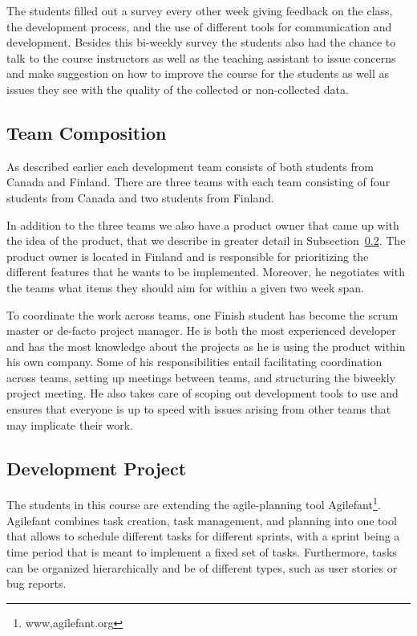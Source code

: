 The students filled out a survey every other week giving feedback on the class, the development process, and the use of different tools for communication and development.
Besides this bi-weekly survey the students also had the chance to talk to the course instructors as well as the teaching assistant to issue concerns and make suggestion on how to improve the course for the students as well as issues they see with the quality of the collected or non-collected data.

\subsection{Team Composition}
As described earlier each development team consists of both students from Canada and Finland.
There are three teams with each team consisting of four students from Canada and two students from Finland.

In addition to the three teams we also have a product owner that came up with the idea of the product, that we describe in greater detail in Subsection~\ref{chap:make:subset:devproject}.
The product owner is located in Finland and is responsible for prioritizing the different features that he wants to be implemented.
Moreover, he negotiates with the teams what items they should aim for within a given two week span. 

To coordinate the work across teams, one Finish student has become the scrum master or de-facto project manager.
He is both the most experienced developer and has the most knowledge about the projects as he is using the product within his own company.
Some of his responsibilities entail facilitating coordination across teams,  setting up meetings between teams, and structuring the biweekly project meeting.
He also takes care of scoping out development tools to use and ensures that everyone is up to speed with issues arising from other teams that may implicate their work.

\subsection{Development Project}
\label{chap:make:subset:devproject}
The students in this course are extending the agile-planning tool Agilefant\footnote{www,agilefant.org}.
Agilefant combines task creation, task management, and planning into one tool that allows to schedule different tasks for different sprints, with a sprint being a time period that is meant to implement a fixed set of tasks.
Furthermore, tasks can be organized hierarchically and be of different types, such as user stories or bug reports.
 
